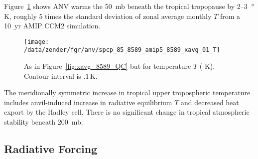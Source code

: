 \documentclass[twoside,agupp]{aguplus}
\begin{document}
Figure~\ref{fig:xavg_8589_T} shows ANV warms the 50~mb beneath the
tropical tropopause by 2--3~$^{\circ}$K, roughly 5 times the standard
deviation of zonal average monthly $T$ from a 10~yr AMIP CCM2
simulation. 
\begin{figure}
\begin{center}
\texttt{[image: /data/zender/fgr/anv/spcp\_85\_8589\_amip5\_8589\_xavg\_01\_T]}\vfill
\end{center}
\caption{
As in Figure~\ref{fig:xavg_8589_QC} but for temperature $T$ (\dgr
K).
Contour interval is .1\,\dgr K. 
\label{fig:xavg_8589_T}}   
\end{figure}
The meridionally symmetric increase in tropical upper tropospheric
temperature includes anvil-induced increase in radiative equilibrium
$T$ and decreased heat export by the Hadley cell.
There is no significant change in tropical atmospheric stability
beneath 200~mb. 

\subsection{Radiative Forcing}\label{sec:cf}
\end{document}
